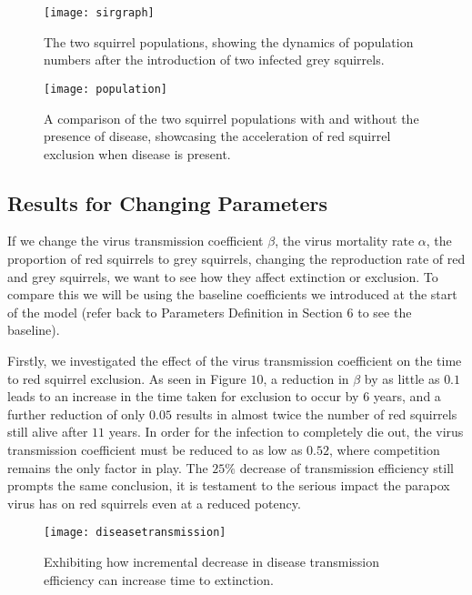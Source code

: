 \documentclass{article}
\begin{document}
\begin{figure}[H]
\begin{center}
\texttt{[image: sirgraph]}
\caption{The two squirrel populations, showing the dynamics of population numbers after the introduction of two infected grey squirrels.}
\end{center}
\end{figure}

\begin{figure}[H]
\begin{center}
\texttt{[image: population]}
\caption{A comparison of the two squirrel populations with and without the presence of disease, showcasing the acceleration of red squirrel exclusion when disease is present.}
\end{center}
\end{figure}

\subsection{\textbf{Results for Changing Parameters}}

If we change the virus transmission coefficient $\beta$, the virus mortality rate $\alpha$, the proportion of red squirrels to grey squirrels, changing the reproduction rate of red and grey squirrels, we want to see how they affect extinction or exclusion. To compare this we will be using the baseline coefficients we introduced at the start of the model (refer back to Parameters Definition in Section $6$ to see the baseline).

Firstly, we investigated the effect of the virus transmission coefficient on the time to red squirrel exclusion. As seen in Figure $10$, a reduction in $\beta$ by as little as $0.1$ leads to an increase in the time taken for exclusion to occur by $6$ years, and a further reduction of only $0.05$ results in almost twice the number of red squirrels still alive after $11$ years. In order for the infection to completely die out, the virus transmission coefficient must be reduced to as low as $0.52$, where competition remains the only factor in play. The $25\%$ decrease of transmission efficiency still prompts the same conclusion, it is testament to the serious impact the parapox virus has on red squirrels even at a reduced potency.
 
\begin{figure}[H]
\begin{center}
\texttt{[image: diseasetransmission]}
\caption{Exhibiting how incremental decrease in disease transmission efficiency can increase time to extinction.}
\end{center}
\end{figure}
\end{document}

